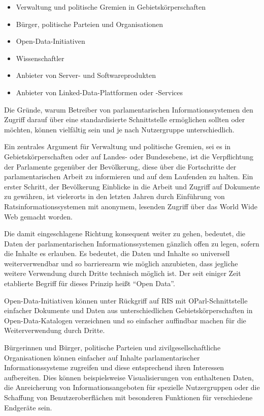 \documentclass[,a4paper]{article}
\begin{document}
\begin{itemize}
\itemsep1pt\parskip0pt
\item
  Verwaltung und politische Gremien in Gebietskörperschaften
\item
  Bürger, politische Parteien und Organisationen
\item
  Open-Data-Initiativen
\item
  Wissenschaftler
\item
  Anbieter von Server- und Softwareprodukten
\item
  Anbieter von Linked-Data-Plattformen oder -Services
\end{itemize}

Die Gründe, warum Betreiber von parlamentarischen Informationssystemen
den Zugriff darauf über eine standardisierte Schnittstelle ermöglichen
sollten oder möchten, können vielfältig sein und je nach Nutzergruppe
unterschiedlich.

Ein zentrales Argument für Verwaltung und politische Gremien, sei es in
Gebietskörperschaften oder auf Landes- oder Bundesebene, ist die
Verpflichtung der Parlamente gegenüber der Bevölkerung, diese über die
Fortschritte der parlamentarischen Arbeit zu informieren und auf dem
Laufenden zu halten. Ein erster Schritt, der Bevölkerung Einblicke in
die Arbeit und Zugriff auf Dokumente zu gewähren, ist vielerorts in den
letzten Jahren durch Einführung von Ratsinformationssystemen mit
anonymem, lesenden Zugriff über das World Wide Web gemacht worden.

Die damit eingeschlagene Richtung konsequent weiter zu gehen, bedeutet,
die Daten der parlamentarischen Informationssystemen gänzlich offen zu
legen, sofern die Inhalte es erlauben. Es bedeutet, die Daten und
Inhalte so universell weiterverwendbar und so barrierearm wie möglich
anzubieten, dass jegliche weitere Verwendung durch Dritte technisch
möglich ist. Der seit einiger Zeit etablierte Begriff für dieses Prinzip
heißt ``Open Data''.

Open-Data-Initiativen können unter Rückgriff auf RIS mit
OParl-Schnittstelle einfacher Dokumente und Daten aus unterschiedlichen
Gebietskörperschaften in Open-Data-Katalogen verzeichnen und so
einfacher auffindbar machen für die Weiterverwendung durch Dritte.

Bürgerinnen und Bürger, politische Parteien und zivilgesellschaftliche
Organisationen können einfacher auf Inhalte parlamentarischer
Informationssysteme zugreifen und diese entsprechend ihren Interessen
aufbereiten. Dies können beispielsweise Visualisierungen von enthaltenen
Daten, die Anreicherung von Informationsangeboten für spezielle
Nutzergruppen oder die Schaffung von Benutzeroberflächen mit besonderen
Funktionen für verschiedene Endgeräte sein.
\end{document}
